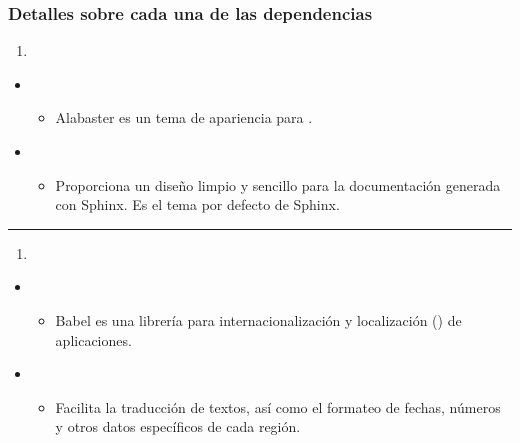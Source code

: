 \documentclass[a4paper,10pt,oneside,spanish,openany]{sphinxmanual}
\begin{document}
\subsubsection{Detalles sobre cada una de las dependencias}
\label{\detokenize{configuracion_inicial/002.instalacion_librerias:detalles-sobre-cada-una-de-las-dependencias}}\begin{enumerate}
%
\item {} 
\sphinxAtStartPar
{}

\end{enumerate}
\begin{itemize}
\item {} 
\sphinxAtStartPar
{}
\begin{itemize}
\item {} 
\sphinxAtStartPar
Alabaster es un tema de apariencia para .

\end{itemize}

\item {} 
\sphinxAtStartPar
{}
\begin{itemize}
\item {} 
\sphinxAtStartPar
Proporciona un diseño limpio y sencillo para la documentación generada con Sphinx. Es el tema por defecto de Sphinx.

\end{itemize}

\end{itemize}


\bigskip\hrule\bigskip

\begin{enumerate}
%
\setcounter{enumi}{1}
\item {} 
\sphinxAtStartPar
{}

\end{enumerate}
\begin{itemize}
\item {} 
\sphinxAtStartPar
{}
\begin{itemize}
\item {} 
\sphinxAtStartPar
Babel es una librería para internacionalización y localización () de aplicaciones.

\end{itemize}

\item {} 
\sphinxAtStartPar
{}
\begin{itemize}
\item {} 
\sphinxAtStartPar
Facilita la traducción de textos, así como el formateo de fechas, números y otros datos específicos de cada región.

\end{itemize}

\end{itemize}
\end{document}
